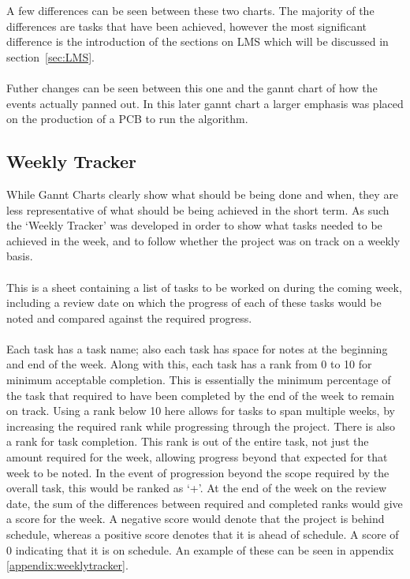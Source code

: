 \noindent
A few differences can be seen between these two charts.
The majority of the differences are tasks that have been achieved, however the most significant difference is the introduction of the sections on LMS which will be discussed in section~\ref{sec:LMS}.
\\
\\
Futher changes can be seen between this one and the gannt chart of how the events actually panned out.
In this later gannt chart a larger emphasis was placed on the production of a PCB to run the algorithm.

\subsection{Weekly Tracker}
While Gannt Charts clearly show what should be being done and when, they are less representative of what should be being achieved in the short term.
As such the `Weekly Tracker' was developed in order to show what tasks needed to be achieved in the week, and to follow whether the project was on track on a weekly basis.
\\
\\
This is a sheet containing a list of tasks to be worked on during the coming week, including a review date on which the progress of each of these tasks would be noted and compared against the required progress.
\\
\\
Each task has a task name; also each task has space for notes at the beginning and end of the week.
Along with this, each task has a rank from 0 to 10 for minimum acceptable completion.
This is essentially the minimum percentage of the task that required to have been completed by the end of the week to remain on track.
Using a rank below 10 here allows for tasks to span multiple weeks, by increasing the required rank while progressing through the project.
There is also a rank for task completion.
This rank is out of the entire task, not just the amount required for the week, allowing progress beyond that expected for that week to be noted.
In the event of progression beyond the scope required by the overall task, this would be ranked as `+'.
At the end of the week on the review date, the sum of the differences between required and completed ranks would give a score for the week.
A negative score would denote that the project is behind schedule, whereas a positive score denotes that it is ahead of schedule.
A score of 0 indicating that it is on schedule.
An example of these can be seen in appendix \ref{appendix:weeklytracker}.
